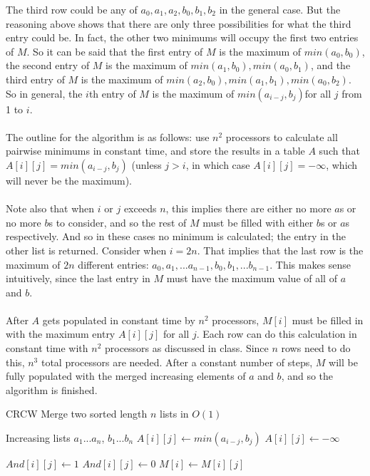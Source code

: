 \documentclass[letterpaper,notitlepage,twoside]{article}
\begin{document}
The third row could be any of $a_0, a_1, a_2, b_0, b_1, b_2$ in the general case. But the reasoning above shows that there are only three possibilities for what the third entry could be. In fact, the other two minimums will occupy the first two entries of $M$. So it can be said that the first entry of $M$ is the maximum of $min(a_0, b_0)$, the second entry of $M$ is the maximum of $min(a_1, b_0), min(a_0, b_1)$, and the third entry of $M$ is the maximum of $min(a_2, b_0), min(a_1, b_1), min(a_0, b_2)$. So in general, the $i$th entry of $M$ is the maximum of $min(a_{i - j}, b_j)$for all $j$ from 1 to $i$.
\\\\
The outline for the algorithm is as follows: use $n^2$ processors to calculate all pairwise minimums in constant time, and store the results in a table $A$ such that $A[i][j] = min(a_{i - j}, b_j)$ (unless $j > i$, in which case $A[i][j] = -\infty$, which will never be the maximum).
\\\\
Note also that when $i$ or $j$ exceeds $n$, this implies there are either no more $a$s or no more $b$s to consider, and so the rest of $M$ must be filled with either $b$s or $a$s respectively. And so in these cases no minimum is calculated; the entry in the other list is returned. Consider when $i = 2n$. That implies that the last row is the maximum of $2n$ different entries: $a_0, a_1, ... a_{n - 1}, b_0, b_1, ... b_{n - 1}$. This makes sense intuitively, since the last entry in $M$ must have the maximum value of all of $a$ and $b$.
\\\\
After $A$ gets populated in constant time by $n^2$ processors, $M[i]$ must be filled in with the maximum entry $A[i][j]$ for all $j$. Each row can do this calculation in constant time with $n^2$ processors as discussed in class. Since $n$ rows need to do this, $n^3$ total processors are needed. After a constant number of steps, $M$ will be fully populated with the merged increasing elements of $a$ and $b$, and so the algorithm is finished.

\begin{algorithm}[H]
	\begin{algorithmic}%
		\caption{CRCW Merge two sorted length $n$ lists in $O(1)$}
		\Require Increasing lists $a_1...a_n$, $b_1...b_n$
			 
				\State $A[i][j] \gets min(a_{i - j}, b_j)$
			\Else
				\State $A[i][j] \gets -\infty$
			\EndIf

		\EndIf

		\State $And[i][j] \gets 1$ 
		 
			\State $And[i][j] \gets 0$ 
		\EndIf
		 
			\State $M[i] \gets M[i][j]$ 
		\EndIf
	\end{algorithmic}
\end{algorithm}
\end{document}
